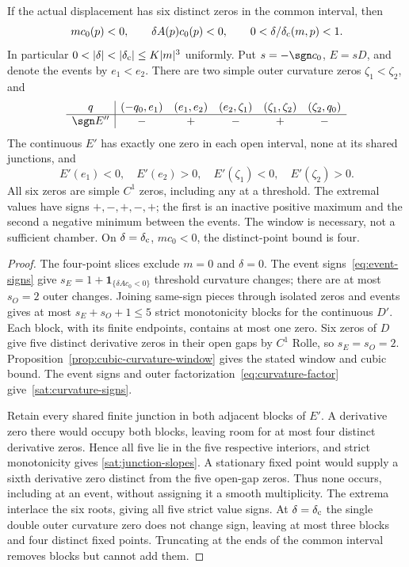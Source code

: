 \begin{lemma}
\label{sat:saturation}\label{corner:saturated-geometry}
\label{cor:six-necessary-window}
If the actual displacement has six distinct zeros in the common interval,
then
\[
 mc_0(p)<0,\qquad \delta A(p)c_0(p)<0,\qquad
 0<\delta/\delta_{\rm c}(m,p)<1.
\]
In particular $0<|\delta|<|\delta_{\rm c}|\le K|m|^3$ uniformly.
Put $s=-\sgn c_0$, $E=sD$, and denote the events by $e_1<e_2$.
There are two simple outer curvature zeros $\zeta_1<\zeta_2$, and
\begin{equation}\label{sat:curvature-signs}
 \begin{array}{c|ccccc}
 q&(-q_0,e_1)&(e_1,e_2)&(e_2,\zeta_1)&
       (\zeta_1,\zeta_2)&(\zeta_2,q_0)\\ \hline
 \sgn E''&-&+&-&+&-
 \end{array}
\end{equation}
The continuous $E'$ has exactly one zero in each open interval, none
at its shared junctions, and
\begin{equation}\label{sat:junction-slopes}
 E'(e_1)<0,\quad E'(e_2)>0,\quad
 E'(\zeta_1)<0,\quad E'(\zeta_2)>0.
\end{equation}
All six zeros are simple $C^1$ zeros, including any at a threshold.
The extremal values have signs $+,-,+,-,+$; the first is an inactive
positive maximum and the second a negative minimum between the events.
The window is necessary, not a sufficient chamber. On
$\delta=\delta_{\rm c}$, $mc_0<0$, the distinct-point bound is four.
\end{lemma}

\begin{proof}
The four-point slices exclude $m=0$ and $\delta=0$.
The event signs~\eqref{eq:event-signs} give
$s_E=1+\mathbf1_{\{\delta Ac_0<0\}}$ threshold curvature changes;
there are at most $s_O=2$ outer changes. Joining same-sign pieces
through isolated zeros and events gives at most $s_E+s_O+1\le5$
strict monotonicity blocks for the continuous $D'$. Each block,
with its finite endpoints, contains at most one zero. Six zeros of
$D$ give five distinct derivative zeros in their open gaps by $C^1$
Rolle, so $s_E=s_O=2$. Proposition~\ref{prop:cubic-curvature-window}
gives the stated window and cubic bound. The event signs and outer
factorization~\eqref{eq:curvature-factor} give~\eqref{sat:curvature-signs}.

Retain every shared finite junction in both adjacent blocks of $E'$.
A derivative zero there would occupy both blocks, leaving room for at
most four distinct derivative zeros. Hence all five lie in the five
respective interiors, and strict monotonicity gives
\eqref{sat:junction-slopes}. A stationary fixed point would supply a
sixth derivative zero distinct from the five open-gap zeros. Thus none
occurs, including at an event, without assigning it a smooth multiplicity.
The extrema interlace the six roots, giving all five strict value signs.
At $\delta=\delta_{\rm c}$ the single double outer curvature zero does
not change sign, leaving at most three blocks and four distinct fixed
points. Truncating at the ends of the common interval removes blocks
but cannot add them.
\end{proof}


